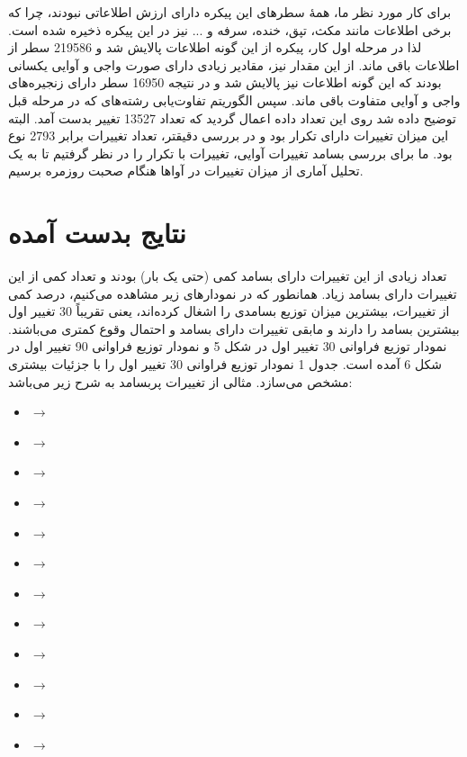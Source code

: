 \documentclass[12pt,onecolumn,a4paper]{article}
\begin{document}
    \par
    برای کار مورد نظر ما، همهٔ سطرهای این پیکره دارای ارزش اطلاعاتی نبودند، چرا که برخی اطلاعات مانند مکث، تپق، خنده، سرفه و ... نیز در این پیکره ذخیره شده است. لذا در مرحله اول کار، پیکره از این گونه اطلاعات پالایش شد و 219586 سطر از اطلاعات باقی ماند. از این مقدار نیز، مقادیر زیادی دارای صورت واجی و آوایی یکسانی بودند که این گونه اطلاعات نیز پالایش شد و در نتیجه 16950 سطر دارای زنجیره‌های واجی و آوایی متفاوت باقی ماند. سپس الگوریتم تفاوت‌یابی رشته‌های که در مرحله قبل توضیح داده شد روی این تعداد داده اعمال گردید که تعداد 13527 تغییر بدست آمد. البته این میزان تغییرات دارای تکرار بود و در بررسی دقیقتر، تعداد تغییرات برابر 2793 نوع بود. ما برای بررسی بسامد تغییرات آوایی، تغییرات با تکرار را در نظر گرفتیم تا به یک تحلیل آماری از میزان تغییرات در آواها هنگام صحبت روزمره برسیم.

    \section{نتایج بدست آمده}
    تعداد زیادی از این تغییرات دارای بسامد کمی (حتی یک بار) بودند و تعداد کمی از این تغییرات دارای بسامد زیاد. همانطور که در نمودارهای زیر مشاهده می‌کنیم، درصد کمی از تغییرات، بیشترین میزان توزیع بسامدی را اشغال کرده‌اند، یعنی تقریباً 30 تغییر اول بیشترین بسامد را دارند و مابقی تغییرات دارای بسامد و احتمال وقوع کمتری می‌باشند. نمودار توزیع فراوانی 30 تغییر اول در شکل 5 و نمودار توزیع فراوانی 90 تغییر اول در شکل 6 آمده است. جدول 1 نمودار توزیع فراوانی 30 تغییر اول را با جزئیات بیشتری مشخص می‌سازد. مثالی از تغییرات پربسامد به شرح زیر می‌باشد:

    \begin{LTR}
        \begin{itemize}
            \item {} $\rightarrow$ 
            \item {} $\rightarrow$ 
            \item {} $\rightarrow$ 
            \item {} $\rightarrow$ 
            \item {} $\rightarrow$ 
            \item {} $\rightarrow$ 
            \item {} $\rightarrow$ 
            \item {} $\rightarrow$ 
            \item {} $\rightarrow$ 
            \item {} $\rightarrow$ 
            \item {} $\rightarrow$ 
            \item {} $\rightarrow$ 
        \end{itemize}
    \end{LTR}
\end{document}

